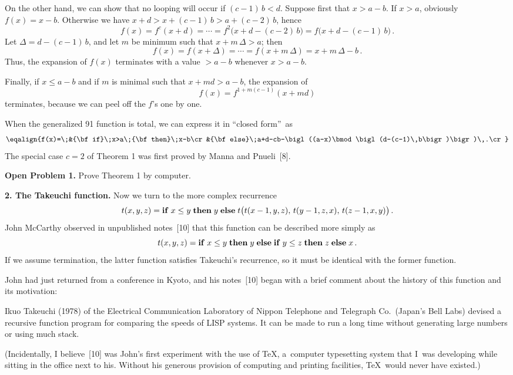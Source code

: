 \documentclass{article}
\begin{document}
On the other hand, we can show that no looping will occur if
$(c-1)\,b<d$. Suppose first that $x>a-b$. If $x>a$, obviously
$f(x)=x-b$. Otherwise we have $x+d>x+(c-1)\,b>a+(c-2)\,b$, hence
$$f(x)=f^c(x+d)=\cdots
=f^2\bigl(x+d-(c-2)\,b\bigr)=f\bigl(x+d-(c-1)\,b\bigr)\,.$$
Let $\Delta=d-(c-1)\,b$, and let $m$ be minimum such that
$x+m\,\Delta>a$; then
$$f(x)=f(x+\Delta)=\cdots =f(x+m\,\Delta)=x+m\,\Delta-b\,.$$
Thus, the expansion of $f(x)$ terminates with a value $>a-b$ whenever
$x>a-b$. 

Finally, if $x\leq a-b$ and if $m$ is minimal such that $x+md>a-b$,
the expansion of
$$f(x)=f^{1+m(c-1)}(x+md)$$
terminates, because we can peel off the $f$'s one by one.\quad\pfbox

When the generalized 91 function is total, we can express it in
``closed form''~as
$$\eqalign{f(x)=\;&{\bf if}\;x>a\;{\bf then}\;x-b\cr
&{\bf
else}\;a+d-cb-\bigl((a-x)\bmod\bigl(d-(c-1)\,b\bigr)\bigr)\,.\cr}$$
The special case $c=2$ of Theorem 1 was first proved by Manna and
Pnueli~[8]. 

\medskip\noindent
{\bf Open Problem 1.}\enspace
Prove Theorem 1 by computer.\quad\pfbox

\bigskip\noindent
{\bf 2. The Takeuchi function.}\enspace
Now we turn to the more complex recurrence
$$t(x,y,z)={\bf if}\;x\leq y\;{\bf then}\;y\;{\bf else}\;
t\bigl(t(x-1,y,z),\,t(y-1,z,x),\,t(z-1,x,y)\bigr)\,.$$
John McCarthy observed in unpublished notes~[10]
that this function can be
described more simply as
$$t(x,y,z)={\bf if}\;x\leq y\;{\bf then}\;y\;{\bf else}\;{\bf if}\;
y\leq z\;{\bf then}\; z\;{\bf else}\;x\,.$$
If we assume termination, the latter function satisfies Takeuchi's 
recurrence, so it must be identical with the former function.

John had just returned from a conference in Kyoto, and his notes~[10]
began with a brief comment about the history of this function and its
motivation:

{\narrower\smallskip\noindent
Ikuo Takeuchi (1978) of the Electrical Communication Laboratory of
Nippon Telephone and Telegraph Co.\ (Japan's Bell Labs) devised a
recursive function program for comparing the speeds of LISP systems.
It can be made to run a long time without generating large numbers or
using much stack.
\smallskip}

\noindent
(Incidentally, I believe~[10] was John's first experiment with the use
of \TeX, a~computer typesetting system that I~was developing while
sitting in the office next to his. Without his generous provision of
computing and printing facilities, \TeX\ would never have existed.)
\end{document}

